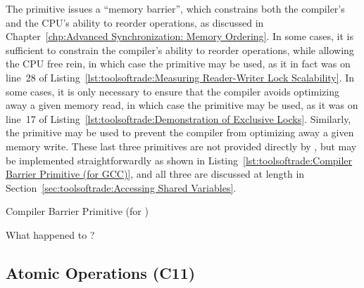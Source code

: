 The  primitive issues a ``memory barrier'',
which constrains both the compiler's and the CPU's ability to reorder
operations, as discussed in
Chapter~\ref{chp:Advanced Synchronization: Memory Ordering}.
In some cases, it is sufficient to constrain the compiler's ability
to reorder operations, while allowing the CPU free rein, in which
case the  primitive may be used, as it in fact was
on line~28 of
Listing~\ref{lst:toolsoftrade:Measuring Reader-Writer Lock Scalability}.
In some cases, it is only necessary to ensure that the compiler
avoids optimizing away a given memory read, in which case the
 primitive may be used, as it was on line~17 of
Listing~\ref{lst:toolsoftrade:Demonstration of Exclusive Locks}.
Similarly, the  primitive may be used to prevent the
compiler from optimizing away a given memory write.
These last three primitives are not provided directly by \GCC,
but may be implemented straightforwardly as shown in
Listing~\ref{lst:toolsoftrade:Compiler Barrier Primitive (for GCC)},
and all three are discussed at length in
Section~\ref{sec:toolsoftrade:Accessing Shared Variables}.

\begin{listing}[tb]

\caption{Compiler Barrier Primitive (for \GCC)}
\label{lst:toolsoftrade:Compiler Barrier Primitive (for GCC)}
\end{listing}

\QuickQuiz{}
	What happened to ?
 \QuickQuizEnd

\subsection{Atomic Operations (C11)}
\label{sec:toolsoftrade:Atomic Operations (C11)}

